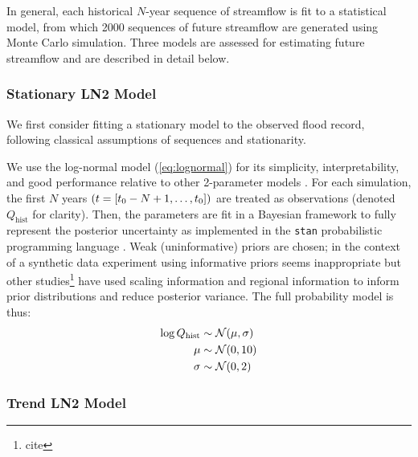\documentclass[12pt]{article}
\begin{document}
In general, each historical $N$-year sequence of streamflow is fit to a statistical model, from which 2000 sequences of future streamflow are generated using Monte Carlo simulation.
Three models are assessed for estimating future streamflow and are described in detail below.

\subsubsection{Stationary LN2 Model\label{sec:method-stationary}}

We first consider fitting a stationary model to the observed flood record, following classical assumptions of \iid sequences and stationarity.

We use the log-normal model (\cref{eq:lognormal}) for its simplicity, interpretability, and good performance relative to other 2-parameter models \citep{Vogel1996}.
For each simulation, the first $N$ years \(\qty(t=[t_0-N+1, \ldots, t_0])\) are treated as observations (denoted \(Q_{\text{hist}}\) for clarity).
Then, the parameters are fit in a Bayesian framework to fully represent the posterior uncertainty as implemented in the \texttt{stan} probabilistic programming language \citep{Carpenter2016}.
Weak (uninformative) priors are chosen; in the context of a synthetic data experiment using informative priors seems inappropriate but other studies\footnote{cite} have used scaling information and regional information to inform prior distributions and reduce posterior variance.
The full probability model is thus:
\begin{align}
  \log Q_\text{hist} & \sim \mathcal{N} \qty(\mu, \sigma) \\
  \mu &\sim \mathcal{N} \qty(0, 10) \\
  \sigma &\sim \mathcal{N} \qty(0, 2)
\end{align}

\subsubsection{Trend LN2 Model\label{sec:method-trend}}
\end{document}
